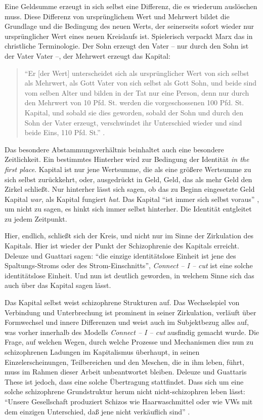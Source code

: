 \documentclass[12pt,
               paper=a4,
               twoside=false,
               onehalfspacing,
               bibliography=totoc,
               toc=graduated,
               ]{scrartcl}
\newcommand{\pc}[2]{\parencite[#1]{#2}}
\newcommand{\cic}{Connect -- I -- cut\xspace}
\newcommand{\dg}{Deleuze und Guattari\xspace}
\begin{document}
Eine Geldsumme erzeugt in sich selbst eine Differenz, die es wiederum
auslöschen muss. Diese Differenz von ursprünglichem Wert und Mehrwert
bildet die Grundlage und die Bedingung des neuen Werts, der
seinerseits sofort wieder nur \glq ursprünglicher\grq{} Wert eines
neuen Kreislaufs ist. Spielerisch verpackt Marx das in christliche
Terminologie. Der Sohn erzeugt den Vater -- nur durch den Sohn ist der
Vater Vater --, der Mehrwert erzeugt das Kapital:
%
\begin{spacing}{1}
\begin{quote}
"`Er [der Wert] unterscheidet sich als ursprünglicher
Wert von sich selbst als Mehrwert, als Gott Vater von sich selbst als
Gott Sohn, und beide sind vom selben Alter und bilden in der Tat nur
eine Person, denn nur durch den Mehrwert von 10 Pfd. St. werden die
vorgeschossenen 100 Pfd. St. Kapital, und sobald sie dies geworden,
sobald der Sohn und durch den Sohn der Vater erzeugt, verschwindet ihr
Unterschied wieder und sind beide Eins, 110 Pfd. St."' \pc{S. 169
f.}{kap}.
\end{quote}
\end{spacing}

Das besondere Abstammungsverhältnis beinhaltet auch eine besondere
Zeitlichkeit. Ein bestimmtes \glq Hinterher\grq{} wird zur Bedingung
der Identität \emph{in the first place}. Kapital ist nur jene
Wertsumme, die als eine größere Wertsumme zu sich selbst zurückkehrt,
oder, ausgedrückt in Geld, Geld, das als mehr Geld den Zirkel
schließt. Nur hinterher lässt sich sagen, ob das zu Beginn eingesetzte
Geld Kapital \emph{war}, als Kapital fungiert \emph{hat}. Das Kapital
"`ist immer sich selbst voraus"' \pc{125}{strauss}, um nicht zu sagen,
es hinkt sich immer selbst hinterher. Die Identität entgleitet zu
jedem Zeitpunkt.

Hier, endlich, schließt sich der Kreis, und nicht nur im Sinne der
Zirkulation des Kapitals. Hier ist wieder der Punkt der Schizophrenie
des Kapitals erreicht. \dg sagen: "`die einzige identitätslose Einheit
ist jene des Spaltungs-Stroms oder des Strom-Einschnitts"',
\emph{\cic} ist eine solche identitätslose Einheit. Und nun ist
deutlich geworden, in welchem Sinne sich das auch über das Kapital
sagen lässt.

Das Kapital selbst weist schizophrene Strukturen auf. Das Wechselspiel
von Verbindung und Unterbrechung ist prominent in seiner Zirkulation,
verläuft über Formwechsel und innere Differenzen und weist auch im
Subjektbezug alles auf, was vorher innerhalb des Modells \emph{\cic}
ausfindig gemacht wurde. Die Frage, auf welchen Wegen, durch welche
Prozesse und Mechanismen dies nun zu schizophrenen Ladungen im
Kapitalismus überhaupt, in seinen Einzelerscheinungen, Teilbereichen
und den Meschen, die in ihm leben, führt, muss im Rahmen dieser Arbeit
unbeantwortet bleiben. Deleuze und Guattaris These ist jedoch, dass
eine solche Übertragung stattfindet. Dass sich um eine solche
schizophrene Grundstruktur herum nicht nicht-schizophren leben lässt:
"`Unsere Gesellschaft produziert Schizos wie Haarwaschmittel oder wie
VWs mit dem einzigen Unterschied, daß jene nicht verkäuflich sind"'
\pc{S. 315 f.}{ao}.
\end{document}
